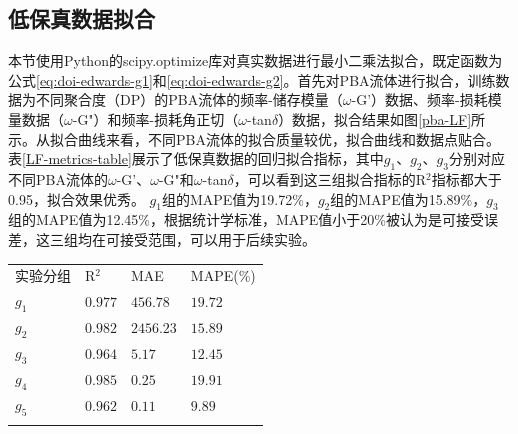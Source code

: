 \subsection{低保真数据拟合}
本节使用Python的scipy.optimize库对真实数据进行最小二乘法拟合，既定函数为公式\eqref{eq:doi-edwards-g1}和\eqref{eq:doi-edwards-g2}。首先对PBA流体进行拟合，训练数据为不同聚合度（DP）的PBA流体的频率-储存模量（$\omega$-G'）数据、频率-损耗模量数据（$\omega$-G"）和频率-损耗角正切（$\omega$-tan$\delta$）数据，拟合结果如图\ref{pba-LF}所示。从拟合曲线来看，不同PBA流体的拟合质量较优，拟合曲线和数据点贴合。表\ref{LF-metrics-table}展示了低保真数据的回归拟合指标，其中$g_1$、$g_2$、$g_3$分别对应不同PBA流体的$\omega$-G'、$\omega$-G"和$\omega$-tan$\delta$，可以看到这三组拟合指标的R$^2$指标都大于0.95，拟合效果优秀。
$g_1$组的MAPE值为19.72\%，$g_2$组的MAPE值为15.89\%，$g_3$组的MAPE值为12.45\%，根据统计学标准，MAPE值小于20\%被认为是可接受误差，这三组均在可接受范围，可以用于后续实验。
\begin{table}
  \centering
  \small
  \begin{tabularx}{\textwidth}{>{\centering\arraybackslash}X >{\centering\arraybackslash}X >{\centering\arraybackslash}X >{\centering\arraybackslash}X} %
    \Xhline{1.5pt}
    实验分组  & R$^2$   & MAE       & MAPE(\%)                \tabularnewline
    \Xhline{0.5pt}  %
    $g_1$ & $0.977$ & $456.78$  & $19.72$ \tabularnewline
    $g_2$ & $0.982$ & $2456.23$ & $15.89 $ \tabularnewline
    $g_3$ & $0.964$ & $5.17$    & $12.45$ \tabularnewline
    $g_4$ & $0.985$ & $0.25$    & $19.91$\tabularnewline
    $g_5$ & $0.962$ & $0.11$    & $9.89$\tabularnewline
    \Xhline{1.5pt}
  \end{tabularx}
\end{table}
